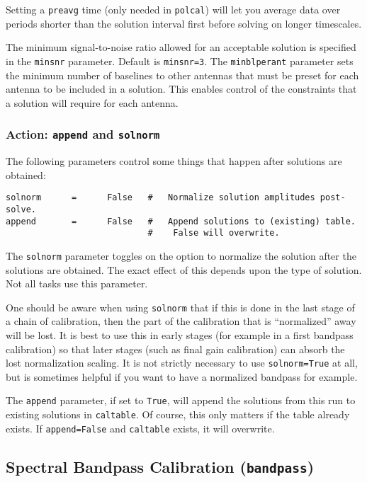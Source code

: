 Setting a {\tt preavg} time (only needed in {\tt polcal}) will let you
average data over periods shorter than the solution interval first
before solving on longer timescales.

The minimum signal-to-noise ratio allowed for an acceptable solution
is specified in the {\tt minsnr} parameter.  Default is {\tt minsnr=3}.
The {\tt minblperant} parameter sets the minimum number of baselines
to other antennas that must be preset for each antenna to be
included in a solution.  This enables control of the constraints
that a solution will require for each antenna.

\subsubsection{Action: {\tt append} and {\tt solnorm} }
\label{section:cal.solve.pars.action}

The following parameters control some things that happen after
solutions are obtained:
\small
\begin{verbatim}
solnorm      =      False   #   Normalize solution amplitudes post-solve.
append       =      False   #   Append solutions to (existing) table.
                            #    False will overwrite.
\end{verbatim} 
\normalsize

The {\tt solnorm} parameter toggles on the option to normalize the
solution after the solutions are obtained.  The exact
effect of this depends upon the type of solution.  Not all tasks
use this parameter.  

One should be aware when using {\tt solnorm} that if this is done
in the last stage of a chain of calibration, then the part of 
the calibration that is ``normalized'' away will be lost.  It is
best to use this in early stages (for example in a first bandpass
calibration) so that later stages (such as final gain calibration)
can absorb the lost normalization scaling.  It is not strictly
necessary to use {\tt solnorm=True} at all, but is sometimes helpful
if you want to have a normalized bandpass for example.

The {\tt append} parameter, if set to {\tt True}, will append the
solutions from this run to existing solutions in {\tt caltable}.
Of course, this only matters if the table already exists.  If
{\tt append=False} and {\tt caltable} exists, it will overwrite.

\subsection{Spectral Bandpass Calibration ({\tt bandpass})}
\label{section:cal.solve.band}

